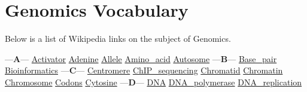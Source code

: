 \chapter{Genomics Vocabulary}
\label{ch-genomics-vocab}

Below is a list of Wikipedia links on the subject of Genomics.



\setlength{\columnsep}{1.5cm}
\begin{multicols}{3}
\noindent
---{\bf A}---\newline
\href{https://en.wikipedia.org/wiki/Activator_(genetics)}{Activator}\newline
\href{https://en.wikipedia.org/wiki/Adenine}{Adenine}\newline
\href{https://en.wikipedia.org/wiki/Allele}{Allele}\newline
\href{https://en.wikipedia.org/wiki/Amino_acid}{Amino\_acid}\newline
\href{https://en.wikipedia.org/wiki/Autosome}{Autosome}\newline
---{\bf B}---\newline
\href{https://en.wikipedia.org/wiki/Base_pair}{Base\_pair}\newline
\href{https://en.wikipedia.org/wiki/Bioinformatics}{Bioinformatics}\newline
---{\bf C}---\newline
\href{https://en.wikipedia.org/wiki/Centromere}{Centromere}\newline
\href{https://en.wikipedia.org/wiki/ChIP_sequencing}{ChIP\_sequencing}\newline
\href{https://en.wikipedia.org/wiki/Chromatid}{Chromatid}\newline
\href{https://en.wikipedia.org/wiki/Chromatin}{Chromatin}\newline
\href{https://en.wikipedia.org/wiki/Chromosome}{Chromosome}\newline
\href{https://en.wikipedia.org/wiki/Genetic_code#Codons}{Codons}\newline
\href{https://en.wikipedia.org/wiki/Cytosine}{Cytosine}\newline
---{\bf D}---\newline
\href{https://en.wikipedia.org/wiki/DNA}{DNA}\newline
\href{https://en.wikipedia.org/wiki/DNA_polymerase}{DNA\_polymerase}\newline
\href{https://en.wikipedia.org/wiki/DNA_replication}{DNA\_replication}\newline

\end{multicols}
